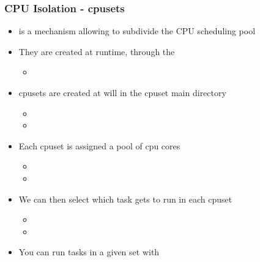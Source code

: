 \begin{frame}
        \frametitle{CPU Isolation - cpusets}
        \begin{itemize}
                \item {} is a mechanism allowing to subdivide the CPU scheduling pool
                \item They are created at runtime, through the 
                        \begin{itemize}
                                \item {}
                        \end{itemize}
                \item cpusets are created at will in the cpuset main directory
                        \begin{itemize}
                                \item {}
                                \item {}
                        \end{itemize}
                \item Each cpuset is assigned a pool of cpu cores
                        \begin{itemize}
                                \item {}
                                \item {}
                        \end{itemize}
                \item We can then select which task gets to run in each cpuset
                        \begin{itemize}
                                \item {}
                                \item {}
                        \end{itemize}
                \item You can run tasks in a given set with 
        \end{itemize}
\end{frame}

